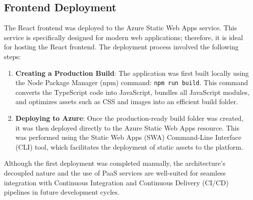 \subsection{Frontend Deployment}

The React frontend was deployed to the Azure Static Web Apps service. This service is specifically designed for modern web applications; therefore, it is ideal for hosting the  React frontend. The deployment process involved the following steps:

\clearpage

\begin {enumerate} [leftmargin=0.75cm]
    \item \textbf{Creating a Production Build}: The application was first built locally using the Node Package Manager (npm) command: \texttt{npm run build}. This command converts the TypeScript code into JavaScript, bundles all JavaScript modules, and optimizes assets such as CSS and images into an efficient build folder.

    \item \textbf{Deploying to Azure}: Once the production-ready build folder was created, it was then deployed directly to the Azure Static Web Apps resource. This was performed using the Static Web Apps (SWA) Command-Line Interface (CLI) tool, which facilitates the deployment of static assets to the platform.

\end{enumerate}

Although the first deployment was completed manually, the architecture's decoupled nature and the use of PaaS services are well-suited for seamless integration with Continuous Integration and Continuous Delivery (CI/CD) pipelines in future development cycles.

